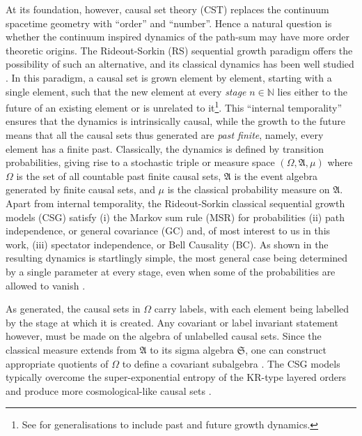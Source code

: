 \documentclass[11pt]{article}
\newcommand{\fA}{\mathfrak A}
\newcommand{\fS}{\mathfrak S}
\newcommand{\bN}{\mathbb N}
\begin{document}
At its foundation,  however, causal set theory (CST)  replaces   the continuum spacetime geometry
with ``order'' and ``number''. Hence  a natural question is whether the continuum
 inspired dynamics of the path-sum may have more order
 theoretic origins. The Rideout-Sorkin (RS)  sequential growth paradigm 
 offers the possibility of such an alternative, and its
 classical dynamics has been well studied 
 \cite{csgone,csgtwo,observables}.  In this paradigm, a causal
 set is grown element by element, starting with a single element, such
 that the new element at every {\sl stage} $n \in \bN$  lies either to the future of an
 existing element or is unrelated to it\footnote{See
   \cite{bdz} for generalisations to include past and future
   growth dynamics.}.  This ``internal temporality'' ensures that
the dynamics is intrinsically  causal, while the growth to the
 future means that all the causal sets thus generated are {\sl past
   finite}, namely, every element has a finite past.  Classically, the dynamics
 is defined by transition probabilities, giving rise to a stochastic
 triple or measure space $(\Omega, \fA, \mu)$ where $\Omega$ is the
 set of all countable past finite causal sets, $\fA$ is the event algebra
 generated by finite causal sets, and $\mu$ is the classical
 probability measure on $\fA$.  Apart from internal temporality, the
 Rideout-Sorkin   classical sequential growth
 models (CSG) satisfy (i) the Markov sum rule (MSR) for probabilities (ii)
 path independence, or general covariance (GC) and, of most interest to us
 in this work,   (iii) spectator independence, or Bell Causality
 (BC). As shown in \cite{csgone} the resulting dynamics is startlingly
 simple, the most general case being determined by a single parameter
 at every stage, even when some of the probabilities are allowed to
 vanish \cite{rv,dsobs,dzbreaktwo}.  


 As generated,  the causal sets in
 $\Omega$ carry labels, with each element being labelled by the stage
 at which it is created. Any covariant or label invariant statement 
 however, must be made on the algebra of unlabelled causal sets. Since
 the classical measure extends from  $\fA$  to its sigma algebra
 $\fS$, one can construct appropriate quotients of $\Omega$ to define
 a covariant subalgebra \cite{observables,dsobs}.  The CSG
 models typically overcome the super-exponential entropy of the 
 KR-type layered  orders and produce more cosmological-like causal sets \cite{csgrg}. 
\end{document}
